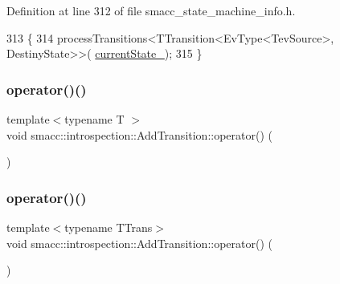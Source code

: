 Definition at line 312 of file smacc\+\_\+state\+\_\+machine\+\_\+info.\+h.


\begin{DoxyCode}
313 \{
314     processTransitions<TTransition<EvType<TevSource>, DestinyState>>(
      \hyperlink{structsmacc_1_1introspection_1_1AddTransition_a56fd9b1bdf6761bbe5258dc915481f4b}{currentState\_});
315 \}
\end{DoxyCode}
\mbox{\label{structsmacc_1_1introspection_1_1AddTransition_a3f9708b6493a5747fbe77361d9711daa}} 
\subsubsection{\texorpdfstring{operator()()}{operator()()}\hspace{0.1cm}{\footnotesize\ttfamily [3/4]}}
{\footnotesize\ttfamily template$<$typename T $>$ \\
void smacc\+::introspection\+::\+Add\+Transition\+::operator() (\begin{DoxyParamCaption}\item[{T}]{ }\end{DoxyParamCaption})}

\mbox{\label{structsmacc_1_1introspection_1_1AddTransition_abfe5dedcabfcc1fa94f767320f9089ab}} 
\subsubsection{\texorpdfstring{operator()()}{operator()()}\hspace{0.1cm}{\footnotesize\ttfamily [4/4]}}
{\footnotesize\ttfamily template$<$typename T\+Trans$>$ \\
void smacc\+::introspection\+::\+Add\+Transition\+::operator() (\begin{DoxyParamCaption}\item[{T\+Trans}]{ }\end{DoxyParamCaption})}



